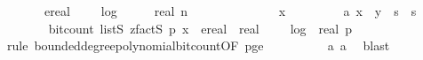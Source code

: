 \begin{isabellebody}
\ \ \ \ \ \ {\isasymle}\ ereal\ {\isacharparenleft}{\kern0pt}{}\ {\isacharplus}{\kern0pt}\ {}\ {\isacharasterisk}{\kern0pt}\ log\ {}\ {\isacharparenleft}{\kern0pt}{}\ {\isacharplus}{\kern0pt}\ {}\ {\isacharasterisk}{\kern0pt}\ real\ n{\isacharparenright}{\kern0pt}{\isacharparenright}{\kern0pt}{\isachardoublequoteclose}\isanewline
\ \ \ \ \isamarkupfalse%
\ {\isacharminus}{\kern0pt}\isanewline
\ \ \ \ \ \ \isamarkupfalse%
\ x\ \isanewline
\ \ \ \ \ \ \isamarkupfalse%
\ a{\isacharunderscore}{\kern0pt}{}{\isacharcolon}{\kern0pt}\ {\isachardoublequoteopen}x\ {\isasymin}\ y\ {\isacharbackquote}{\kern0pt}\ {\isacharparenleft}{\kern0pt}{\isacharbraceleft}{\kern0pt}{}{\isachardot}{\kern0pt}{\isachardot}{\kern0pt}{\isacharless}{\kern0pt}s\ {\isasymtimes}\ {\isacharbraceleft}{\kern0pt}{}{\isachardot}{\kern0pt}{\isachardot}{\kern0pt}{\isacharless}{\kern0pt}s\isanewline
\ \ \ \ \ \ \isamarkupfalse%
\ {\isachardoublequoteopen}bit{\isacharunderscore}{\kern0pt}count\ {\isacharparenleft}{\kern0pt}list\isactrlsub S\ {\isacharparenleft}{\kern0pt}zfact\isactrlsub S\ p{\isacharparenright}{\kern0pt}\ x{\isacharparenright}{\kern0pt}\ {\isasymle}\ ereal\ {\isacharparenleft}{\kern0pt}\ real\ {}\ {\isacharasterisk}{\kern0pt}\ {\isacharparenleft}{\kern0pt}{}\ {\isacharasterisk}{\kern0pt}\ log\ {}\ {\isacharparenleft}{\kern0pt}real\ p{\isacharparenright}{\kern0pt}\ {\isacharplus}{\kern0pt}\ {}{\isacharparenright}{\kern0pt}\ {\isacharplus}{\kern0pt}\ {}{\isacharparenright}{\kern0pt}{\isachardoublequoteclose}\isanewline
\ \ \ \ \ \ \ \ \isamarkupfalse%
\ {\isacharparenleft}{\kern0pt}rule\ bounded{\isacharunderscore}{\kern0pt}degree{\isacharunderscore}{\kern0pt}polynomial{\isacharunderscore}{\kern0pt}bit{\isacharunderscore}{\kern0pt}count{\isacharbrackleft}{\kern0pt}OF\ p{\isacharunderscore}{\kern0pt}ge{\isacharunderscore}{\kern0pt}{}{\isacharbrackright}{\kern0pt}{\isacharparenright}{\kern0pt}\isanewline
\ \ \ \ \ \ \ \ \isamarkupfalse%
\ a{\isacharunderscore}{\kern0pt}{}\ a{\isacharunderscore}{\kern0pt}{}\ \isamarkupfalse%
\ blast\isanewline
\ \ \ \ \ \ \isamarkupfalse%
\ \isamarkupfalse%

\end{isabellebody}
